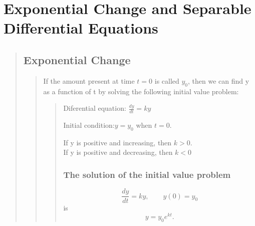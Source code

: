 \documentclass{report}
\begin{document}
\setcounter{section}{3}

\section{Exponential Change and Separable Differential Equations} %
\begin{quote}

	\subsection{Exponential Change}
	\begin{quote}

		If the amount present at time $t = 0$ is called $y_0$, then we can find y as a function of t by solving the following initial value problem:
	
		\begin{quote}


			Diferential equation: \qquad $\frac{dy}{dt}=ky$ \par
			\setlength{\parskip}{2pt}
			Initial condition:\qquad $y = y_{0}$ \quad when \quad $t = 0$.\par
			\setlength{\parskip}{0pt}

			\begin{info} %
				If y is positive and increasing, then $k>0$.\\
				If y is positive and decreasing, then $k<0$
			\end{info}

			\subsubsection{The solution of the initial value problem}
			$$\frac{dy}{dt}=ky, \qquad y(0)=y_{0}$$
			is
			$$y=y_{0}e^{kt}.$$

		\end{quote}
		

	\end{quote}

\end{quote}

\end{document}
